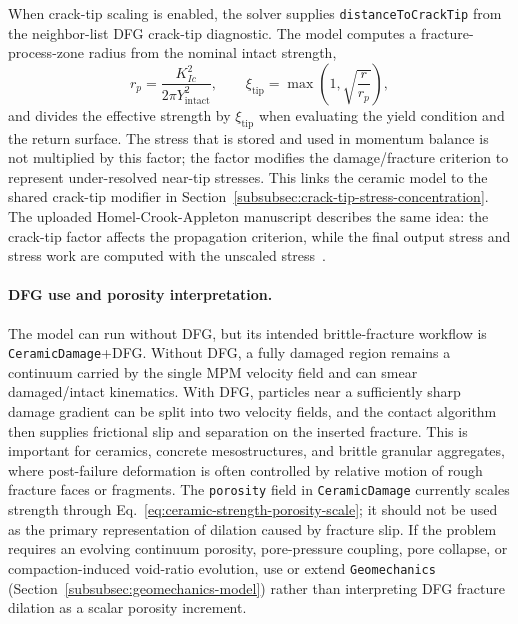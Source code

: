 When crack-tip scaling is enabled, the solver supplies \texttt{distanceToCrackTip} from the neighbor-list DFG crack-tip diagnostic.  The model computes a fracture-process-zone radius from the nominal intact strength,
\begin{equation}
  r_p = \frac{K_{Ic}^{2}}{2\pi Y_{\text{intact}}^{2}},
  \qquad
  \xi_{\mathrm{tip}} = \max\left(1,\sqrt{\frac{r}{r_p}}\right),
  \label{eq:ceramic-crack-tip-factor}
\end{equation}
and divides the effective strength by \(\xi_{\mathrm{tip}}\) when evaluating the yield condition and the return surface.  The stress that is stored and used in momentum balance is not multiplied by this factor; the factor modifies the damage/fracture criterion to represent under-resolved near-tip stresses.  This links the ceramic model to the shared crack-tip modifier in Section~\ref{subsubsec:crack-tip-stress-concentration}.  The uploaded Homel-Crook-Appleton manuscript describes the same idea: the crack-tip factor affects the propagation criterion, while the final output stress and stress work are computed with the unscaled stress~\cite{homelCrookAppleton2026sizeeffects}.

\paragraph{DFG use and porosity interpretation.}
The model can run without DFG, but its intended brittle-fracture workflow is \texttt{CeramicDamage}+DFG.  Without DFG, a fully damaged region remains a continuum carried by the single MPM velocity field and can smear damaged/intact kinematics.  With DFG, particles near a sufficiently sharp damage gradient can be split into two velocity fields, and the contact algorithm then supplies frictional slip and separation on the inserted fracture.  This is important for ceramics, concrete mesostructures, and brittle granular aggregates, where post-failure deformation is often controlled by relative motion of rough fracture faces or fragments.  The \texttt{porosity} field in \texttt{CeramicDamage} currently scales strength through Eq.~\eqref{eq:ceramic-strength-porosity-scale}; it should not be used as the primary representation of dilation caused by fracture slip.  If the problem requires an evolving continuum porosity, pore-pressure coupling, pore collapse, or compaction-induced void-ratio evolution, use or extend \texttt{Geomechanics} (Section~\ref{subsubsec:geomechanics-model}) rather than interpreting DFG fracture dilation as a scalar porosity increment.

